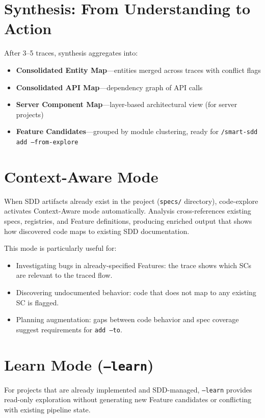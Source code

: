 \documentclass[11pt,a4paper,openright,twoside]{report}
\newcommand{\file}[1]{\texttt{#1}}
\begin{document}
\section{Synthesis: From Understanding to Action}

After 3--5 traces, synthesis aggregates into:

\begin{itemize}
  \item \textbf{Consolidated Entity Map}---entities merged across traces with conflict flags
  \item \textbf{Consolidated API Map}---dependency graph of API calls
  \item \textbf{Server Component Map}---layer-based architectural view (for server projects)
  \item \textbf{Feature Candidates}---grouped by module clustering, ready for \texttt{/smart-sdd add --from-explore}
\end{itemize}

\section{Context-Aware Mode}

When SDD artifacts already exist in the project (\file{specs/} directory), code-explore activates Context-Aware mode automatically. Analysis cross-references existing specs, registries, and Feature definitions, producing enriched output that shows how discovered code maps to existing SDD documentation.

This mode is particularly useful for:
\begin{itemize}
  \item Investigating bugs in already-specified Features: the trace shows which SCs are relevant to the traced flow.
  \item Discovering undocumented behavior: code that does not map to any existing SC is flagged.
  \item Planning augmentation: gaps between code behavior and spec coverage suggest requirements for \texttt{add --to}.
\end{itemize}

\section{Learn Mode (\texttt{--learn})}

For projects that are already implemented and SDD-managed, \texttt{--learn} provides read-only exploration without generating new Feature candidates or conflicting with existing pipeline state.
\end{document}
